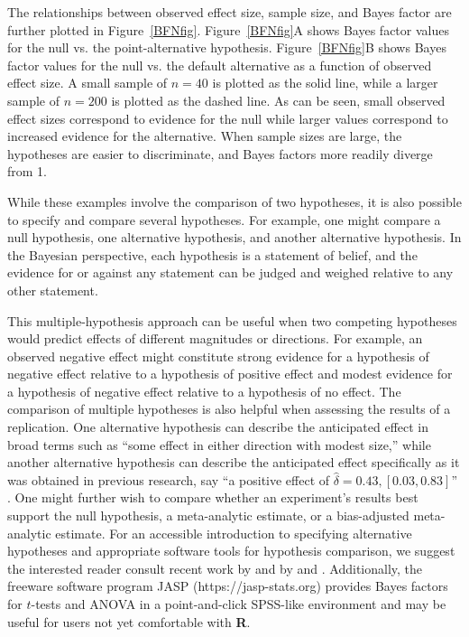 \documentclass[man]{apa6}
\begin{document}
The relationships between observed effect size, sample size, and Bayes factor are further plotted in Figure~\ref{BFNfig}. Figure~\ref{BFNfig}A shows Bayes factor values for the null vs. the point-alternative hypothesis. Figure~\ref{BFNfig}B shows Bayes factor values for the null vs. the default alternative as a function of observed effect size. A small sample of $n=40$ is plotted as the solid line, while a larger sample of $n=200$ is plotted as the dashed line. As can be seen, small observed effect sizes correspond to evidence for the null while larger values correspond to increased evidence for the alternative. When sample sizes are large, the hypotheses are easier to discriminate, and Bayes factors more readily diverge from 1.  

While these examples involve the comparison of two hypotheses, it is also possible to specify and compare several hypotheses. For example, one might compare a null hypothesis, one alternative hypothesis, and another alternative hypothesis. In the Bayesian perspective, each hypothesis is a statement of belief, and the evidence for or against any statement can be judged and weighed relative to any other statement. 

This multiple-hypothesis approach can be useful when two competing hypotheses would predict effects of different magnitudes or directions. For example, an observed negative effect might constitute strong evidence for a hypothesis of negative effect relative to a hypothesis of positive effect and modest evidence for a hypothesis of negative effect relative to a hypothesis of no effect. The comparison of multiple hypotheses is also helpful when assessing the results of a replication. One alternative hypothesis can describe the anticipated effect in broad terms such as ``some effect in either direction with modest size,'' while another alternative hypothesis can describe the anticipated effect specifically as it was obtained in previous research, say ``a positive effect of $\hat{\delta} = 0.43, [0.03, 0.83]$'' \citep[see][for an example]{Boekel:etal:2014}. 
One might further wish to compare whether an experiment's results best support the null hypothesis, a meta-analytic estimate, or a bias-adjusted meta-analytic estimate.  For an accessible introduction to specifying alternative hypotheses and appropriate software tools for hypothesis comparison, we suggest the interested reader consult recent work by \citet{Dienes:2011,Dienes:2014} and by \citet{Rouder:Morey:2012} and \citet{Rouder:etal:2012}. Additionally, the freeware software program JASP (https://jasp-stats.org) provides Bayes factors for $t$-tests and ANOVA in a point-and-click SPSS-like environment and may be useful for users not yet comfortable with {\bf R}. 
\end{document}

